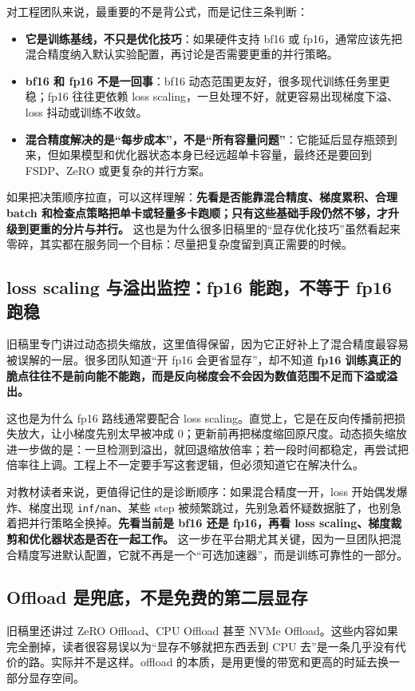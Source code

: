 对工程团队来说，最重要的不是背公式，而是记住三条判断：
\begin{itemize}
  \item \textbf{它是训练基线，不只是优化技巧}：如果硬件支持 bf16 或 fp16，通常应该先把混合精度纳入默认实验配置，再讨论是否需要更重的并行策略。
  \item \textbf{bf16 和 fp16 不是一回事}：bf16 动态范围更友好，很多现代训练任务里更稳；fp16 往往更依赖 loss scaling，一旦处理不好，就更容易出现梯度下溢、loss 抖动或训练不收敛。
  \item \textbf{混合精度解决的是“每步成本”，不是“所有容量问题”}：它能延后显存瓶颈到来，但如果模型和优化器状态本身已经远超单卡容量，最终还是要回到 FSDP、ZeRO 或更复杂的并行方案。
\end{itemize}

如果把决策顺序拉直，可以这样理解：\textbf{先看是否能靠混合精度、梯度累积、合理 batch 和检查点策略把单卡或轻量多卡跑顺；只有这些基础手段仍然不够，才升级到更重的分片与并行。} 这也是为什么很多旧稿里的“显存优化技巧”虽然看起来零碎，其实都在服务同一个目标：尽量把复杂度留到真正需要的时候。

\subsection{loss scaling 与溢出监控：fp16 能跑，不等于 fp16 跑稳}
旧稿里专门讲过动态损失缩放，这里值得保留，因为它正好补上了混合精度最容易被误解的一层。很多团队知道“开 fp16 会更省显存”，却不知道 \textbf{fp16 训练真正的脆点往往不是前向能不能跑，而是反向梯度会不会因为数值范围不足而下溢或溢出。}

这也是为什么 fp16 路线通常要配合 loss scaling。直觉上，它是在反向传播前把损失放大，让小梯度先别太早被冲成 0；更新前再把梯度缩回原尺度。动态损失缩放进一步做的是：一旦检测到溢出，就回退缩放倍率；若一段时间都稳定，再尝试把倍率往上调。工程上不一定要手写这套逻辑，但必须知道它在解决什么。

对教材读者来说，更值得记住的是诊断顺序：如果混合精度一开，loss 开始偶发爆炸、梯度出现 \texttt{inf/nan}、某些 step 被频繁跳过，先别急着怀疑数据脏了，也别急着把并行策略全换掉。\textbf{先看当前是 bf16 还是 fp16，再看 loss scaling、梯度裁剪和优化器状态是否在一起工作。} 这一步在平台期尤其关键，因为一旦团队把混合精度写进默认配置，它就不再是一个“可选加速器”，而是训练可靠性的一部分。

\subsection{Offload 是兜底，不是免费的第二层显存}
旧稿里还讲过 ZeRO Offload、CPU Offload 甚至 NVMe Offload。这些内容如果完全删掉，读者很容易误以为“显存不够就把东西丢到 CPU 去”是一条几乎没有代价的路。实际并不是这样。{\heiti offload 的本质，是用更慢的带宽和更高的时延去换一部分显存空间。}

